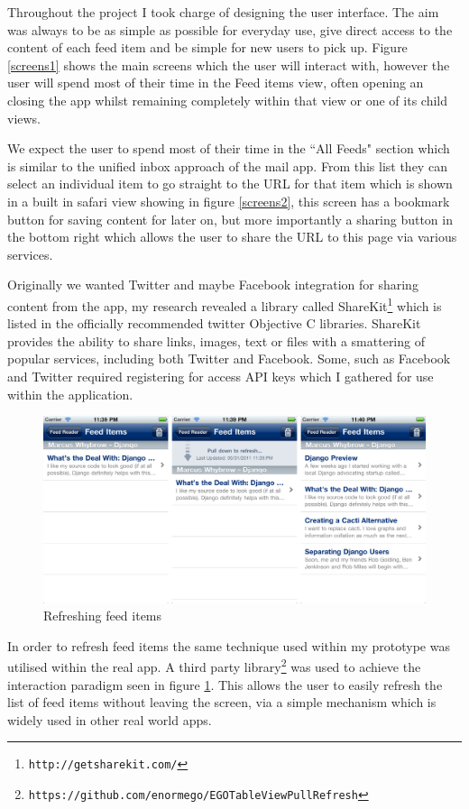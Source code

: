 \documentclass[a4paper,11pt]{article}
\begin{document}
	Throughout the project I took charge of designing the user interface. The aim was always to be as simple as possible for everyday use, give direct access to the content of each feed item and be simple for new users to pick up. Figure \ref{screens1} shows the main screens which the user will interact with, however the user will spend most of their time in the Feed items view, often opening an closing the app whilst remaining completely within that view or one of its child views.
	
	We expect the user to spend most of their time in the ``All Feeds" section which is similar to the unified inbox approach of the mail app. From this list they can select an individual item to go straight to the URL for that item which is shown in a built in safari view showing in figure \ref{screens2}, this screen has a bookmark button for saving content for later on, but more importantly a sharing button in the bottom right which allows the user to share the URL to this page via various services.
	
	Originally we wanted Twitter and maybe Facebook integration for sharing content from the app, my research revealed a library called ShareKit\footnote{\texttt{http://getsharekit.com/}} which is listed in the officially recommended twitter Objective C libraries. ShareKit provides the ability to share links, images, text or files with a smattering of popular services, including both Twitter and Facebook. Some, such as Facebook and Twitter required registering for access API keys which I gathered for use within the application.
	
	\begin{figure}[t]
		\centering
		\includegraphics[width=12.65cm]{images/screens3.png}
		\caption{Refreshing feed items}
		\label{screens3}
	\end{figure}
	
	In order to refresh feed items the same technique used within my prototype was utilised within the real app. A third party library\footnote{\texttt{https://github.com/enormego/EGOTableViewPullRefresh}} was used to achieve the interaction paradigm seen in figure \ref{screens3}. This allows the user to easily refresh the list of feed items without leaving the screen, via a simple mechanism which is widely used in other real world apps.
	
\end{document}
